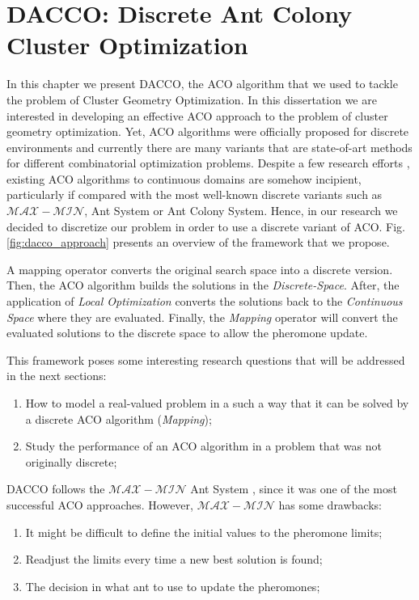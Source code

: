 \chapter{DACCO: Discrete Ant Colony Cluster Optimization}
\label{chap:dacco}

In this chapter we present DACCO, the ACO algorithm that we used to tackle the problem of Cluster Geometry Optimization. In this dissertation we are interested in developing an effective ACO approach to the problem of cluster geometry optimization. Yet, ACO algorithms were officially proposed for discrete environments and currently there are many variants that are state-of-art methods for different combinatorial optimization problems. Despite a few research efforts \cite{bilchev95, kong06, socha04, tsutsui04}, existing ACO algorithms to continuous domains are somehow incipient, particularly if compared with the most well-known discrete variants such as $\mathcal{MAX}-\mathcal{MIN}$, Ant System or Ant Colony System. Hence, in our research we decided to discretize our problem in order to use a discrete variant of ACO. Fig. \ref{fig:dacco_approach} presents an overview of the framework that we propose.  

A mapping operator converts the original search space into a discrete version. Then, the ACO algorithm builds the solutions in the \emph{Discrete-Space}. After, the application of \emph{Local Optimization} converts the solutions back to the \emph{Continuous Space} where they are evaluated. Finally, the \emph{Mapping} operator will convert the evaluated solutions to the discrete space to allow the pheromone update.

This framework poses some interesting research questions that will be addressed in the next sections:
\begin{enumerate}
	\item How to model a real-valued problem in a such a way that it can be solved by a discrete ACO algorithm (\emph{Mapping});
	\item Study the performance of an ACO algorithm in a problem that was not originally discrete;
\end{enumerate}

DACCO follows the $\mathcal{MAX}-\mathcal{MIN}$ Ant System \cite{stutzle00}, since it was one of the most successful ACO approaches. However, $\mathcal{MAX}-\mathcal{MIN}$ has some drawbacks:
\begin{enumerate}
	\item It might be difficult to define the initial values to the pheromone limits;
	\item Readjust the limits every time a new best solution is found; 
	\item The decision in what ant to use to update the pheromones;
\end{enumerate}


